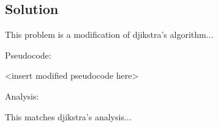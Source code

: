 \subsection*{Solution}

This problem is a modification of djikstra's algorithm...

Pseudocode:

<insert modified pseudocode here>

Analysis:

This matches djikstra's analysis...

